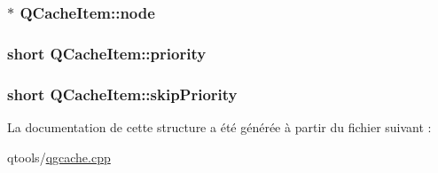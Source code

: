\subsubsection[{node}]{$\ast$ Q\+Cache\+Item\+::node}\label{struct_q_cache_item_a8dbb49b621edfd42824cde3b07b97943}
\hypertarget{struct_q_cache_item_a2386c848679281880c992f9177e87d93}{}
\subsubsection[{priority}]{\setlength{\rightskip}{0pt plus 5cm}short Q\+Cache\+Item\+::priority}\label{struct_q_cache_item_a2386c848679281880c992f9177e87d93}
\hypertarget{struct_q_cache_item_af5a4fb6189e28d3a7fe695ebf0009a44}{}
\subsubsection[{skip\+Priority}]{\setlength{\rightskip}{0pt plus 5cm}short Q\+Cache\+Item\+::skip\+Priority}\label{struct_q_cache_item_af5a4fb6189e28d3a7fe695ebf0009a44}


La documentation de cette structure a été générée à partir du fichier suivant \+:\begin{DoxyCompactItemize}
\item 
qtools/\hyperlink{qgcache_8cpp}{qgcache.\+cpp}\end{DoxyCompactItemize}
